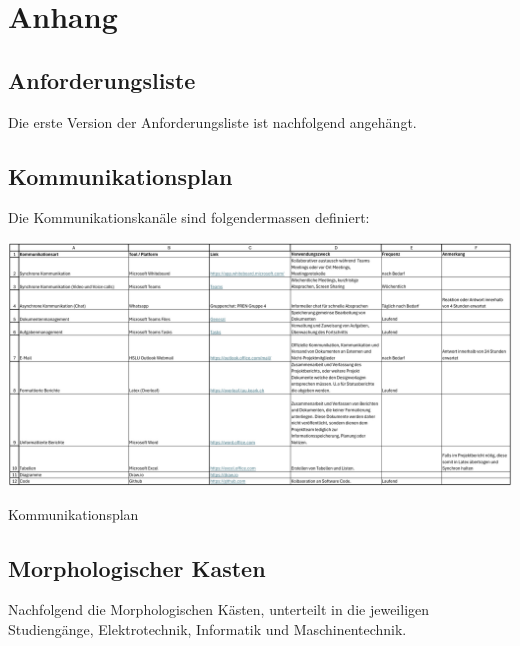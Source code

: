 \newpage
\section{Anhang}

\subsection{Anforderungsliste}\label{anforderungliste}

Die erste Version der Anforderungsliste ist nachfolgend angehängt.





\begin{landscape}
\subsection{Kommunikationsplan}\label{kommunikationsplan}
Die Kommunikationskanäle sind folgendermassen definiert:

\begin{table}[h]
\centering
\includegraphics[width=230mm]{assets/Kommunikationschnittstellen.pdf}
\caption{Kommunikationsplan}
\label{table:communications-plan}
\end{table}
\end{landscape}
\newpage


\subsection{Morphologischer Kasten}\label{Morphologischer Kasten}
Nachfolgend die Morphologischen Kästen, unterteilt in die jeweiligen Studiengänge, Elektrotechnik, Informatik und Maschinentechnik.


